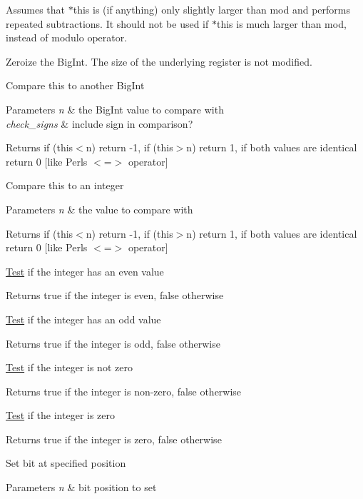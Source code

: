 Assumes that $\ast$this is (if anything) only slightly larger than mod and performs repeated subtractions. It should not be used if $\ast$this is much larger than mod, instead of modulo operator.

Zeroize the Big\+Int. The size of the underlying register is not modified.

Compare this to another Big\+Int 
\begin{DoxyParams}{Parameters}
{\em n} & the Big\+Int value to compare with \\
\hline
{\em check\+\_\+signs} & include sign in comparison? \\
\hline
\end{DoxyParams}
\begin{DoxyReturn}{Returns}
if (this$<$n) return -\/1, if (this$>$n) return 1, if both values are identical return 0 \mbox{[}like Perl\textquotesingle{}s $<$=$>$ operator\mbox{]}
\end{DoxyReturn}
Compare this to an integer 
\begin{DoxyParams}{Parameters}
{\em n} & the value to compare with \\
\hline
\end{DoxyParams}
\begin{DoxyReturn}{Returns}
if (this$<$n) return -\/1, if (this$>$n) return 1, if both values are identical return 0 \mbox{[}like Perl\textquotesingle{}s $<$=$>$ operator\mbox{]}
\end{DoxyReturn}
\mbox{\hyperlink{class_test}{Test}} if the integer has an even value \begin{DoxyReturn}{Returns}
true if the integer is even, false otherwise
\end{DoxyReturn}
\mbox{\hyperlink{class_test}{Test}} if the integer has an odd value \begin{DoxyReturn}{Returns}
true if the integer is odd, false otherwise
\end{DoxyReturn}
\mbox{\hyperlink{class_test}{Test}} if the integer is not zero \begin{DoxyReturn}{Returns}
true if the integer is non-\/zero, false otherwise
\end{DoxyReturn}
\mbox{\hyperlink{class_test}{Test}} if the integer is zero \begin{DoxyReturn}{Returns}
true if the integer is zero, false otherwise
\end{DoxyReturn}
Set bit at specified position 
\begin{DoxyParams}{Parameters}
{\em n} & bit position to set\\
\hline
\end{DoxyParams}
